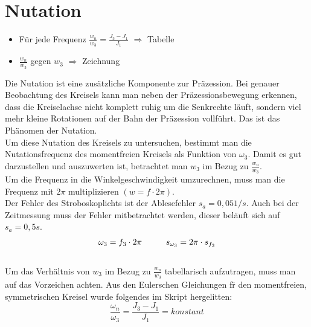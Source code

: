 

\section{Nutation}

\begin{itemize}
    \item Für jede Frequenz $\frac{w_n}{w_3} = \frac{J_3-J_1}{J_1}$ $\Rightarrow$ Tabelle
    \item $\frac{w_n}{w_3}$ gegen $w_3$ $\Rightarrow$ Zeichnung
\end{itemize}

Die Nutation ist eine zus\"atzliche Komponente zur Präzession. Bei genauer Beobachtung des Kreisels kann man neben der Präzessionsbewegung erkennen, dass die Kreiselachse nicht komplett ruhig um die Senkrechte läuft, sondern viel mehr kleine Rotationen auf der Bahn der Präzession vollführt. Das ist das Phänomen der Nutation.\\
Um diese Nutation des Kreisels zu untersuchen, bestimmt man die Nutationsfrequenz des momentfreien Kreisels als Funktion von $\omega_3$. Damit es gut darzustellen und auszuwerten ist, betrachtet man $w_3$ im Bezug zu $\frac{w_n}{w_3}$. \\
Um die Frequenz in die Winkelgeschwindigkeit umzurechnen, muss man die Frequenz mit $2\pi$ multiplizieren $(w = f\cdot2\pi)$.\\
Der Fehler des Stroboskoplichts ist der Ablesefehler $s_a = 0,05 1/s$. 
Auch bei der Zeitmessung muss der Fehler mitbetrachtet werden, dieser beläuft sich auf $s_a = 0,5s$.  \\
\begin{align}
    \omega_3 = f_3\cdot2\pi \tab s_{\omega_3}=2\pi\cdot{s_{f_3}}\\
\end{align}\\
Um das Verh\"altnis von $w_3$ im Bezug zu $\frac{w_n}{w_3}$ tabellarisch aufzutragen, muss man auf das Vorzeichen achten. Aus den Eulerschen Gleichungen f\"r den momentfreien, symmetrischen Kreisel wurde folgendes im Skript hergelitten:
\begin{equation}
    \frac{\omega_n}{\omega_3} = \frac{J_3 - J_1}{J_1} = konstant
\end{equation}\\

